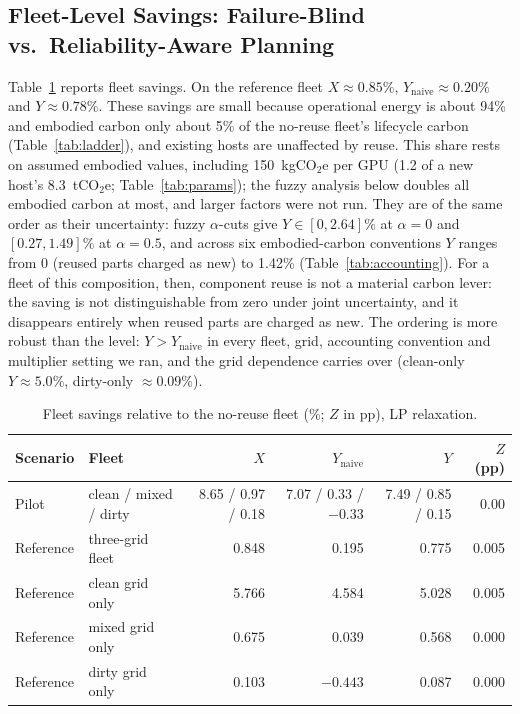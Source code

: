 \documentclass{article} %
\begin{document}
\subsection{Fleet-Level Savings: Failure-Blind vs.\ Reliability-Aware Planning}
\label{sec:fleet}
Table~\ref{tab:fleet_savings} reports fleet savings. On the reference fleet $X \approx 0.85\%$, $Y_{\text{naive}} \approx 0.20\%$ and $Y \approx 0.78\%$. These savings are small because operational energy is about 94\% and embodied carbon only about 5\% of the no-reuse fleet's lifecycle carbon (Table~\ref{tab:ladder}), and existing hosts are unaffected by reuse. This share rests on assumed embodied values, including 150~kgCO$_2$e per GPU (1.2 of a new host's 8.3~tCO$_2$e; Table~\ref{tab:params}); the fuzzy analysis below doubles all embodied carbon at most, and larger factors were not run. They are of the same order as their uncertainty: fuzzy $\alpha$-cuts give $Y\in[0, 2.64]\%$ at $\alpha=0$ and $[0.27, 1.49]\%$ at $\alpha=0.5$, and across six embodied-carbon conventions $Y$ ranges from 0 (reused parts charged as new) to 1.42\% (Table~\ref{tab:accounting}). For a fleet of this composition, then, component reuse is not a material carbon lever: the saving is not distinguishable from zero under joint uncertainty, and it disappears entirely when reused parts are charged as new. The ordering is more robust than the level: $Y > Y_{\text{naive}}$ in every fleet, grid, accounting convention and multiplier setting we ran, and the grid dependence carries over (clean-only $Y \approx 5.0\%$, dirty-only $\approx 0.09\%$).

\begin{table}[t]
\caption{Fleet savings relative to the no-reuse fleet (\%; $Z$ in pp), LP relaxation.}
\label{tab:fleet_savings}
\centering
\small
\begin{tabular}{llrrrr}
\toprule
Scenario & Fleet & $X$ & $Y_{\text{naive}}$ & $Y$ & $Z$ (pp) \\
\midrule
Pilot & clean / mixed / dirty & 8.65 / 0.97 / 0.18 & 7.07 / 0.33 / $-0.33$ & 7.49 / 0.85 / 0.15 & 0.00 \\
\midrule
Reference & three-grid fleet & 0.848 & 0.195 & 0.775 & 0.005 \\
Reference & clean grid only & 5.766 & 4.584 & 5.028 & 0.005 \\
Reference & mixed grid only & 0.675 & 0.039 & 0.568 & 0.000 \\
Reference & dirty grid only & 0.103 & $-0.443$ & 0.087 & 0.000 \\
\bottomrule
\end{tabular}
\end{table}
\end{document}
